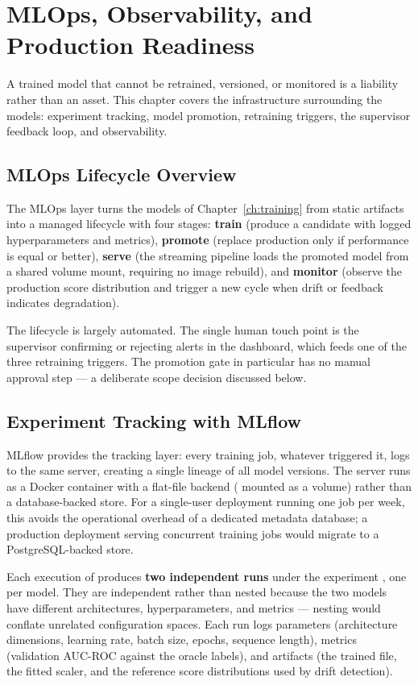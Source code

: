 \chapter{MLOps, Observability, and Production Readiness}
\label{ch:mlops}

A trained model that cannot be retrained, versioned, or monitored is a liability rather than an asset. This chapter covers the infrastructure surrounding the models: experiment tracking, model promotion, retraining triggers, the supervisor feedback loop, and observability.

\section{MLOps Lifecycle Overview}

The MLOps layer turns the models of Chapter~\ref{ch:training} from static artifacts into a managed lifecycle with four stages: \textbf{train} (produce a candidate with logged hyperparameters and metrics), \textbf{promote} (replace production only if performance is equal or better), \textbf{serve} (the streaming pipeline loads the promoted model from a shared volume mount, requiring no image rebuild), and \textbf{monitor} (observe the production score distribution and trigger a new cycle when drift or feedback indicates degradation).

The lifecycle is largely automated. The single human touch point is the supervisor confirming or rejecting alerts in the dashboard, which feeds one of the three retraining triggers. The promotion gate in particular has no manual approval step --- a deliberate scope decision discussed below.

\section{Experiment Tracking with MLflow}

MLflow provides the tracking layer: every training job, whatever triggered it, logs to the same server, creating a single lineage of all model versions. The server runs as a Docker container with a flat-file backend ( mounted as a volume) rather than a database-backed store. For a single-user deployment running one job per week, this avoids the operational overhead of a dedicated metadata database; a production deployment serving concurrent training jobs would migrate to a PostgreSQL-backed store.

Each execution of  produces \textbf{two independent runs} under the experiment , one per model. They are independent rather than nested because the two models have different architectures, hyperparameters, and metrics --- nesting would conflate unrelated configuration spaces. Each run logs parameters (architecture dimensions, learning rate, batch size, epochs, sequence length), metrics (validation AUC-ROC against the oracle labels), and artifacts (the trained  file, the fitted scaler, and the reference score distributions used by drift detection).


